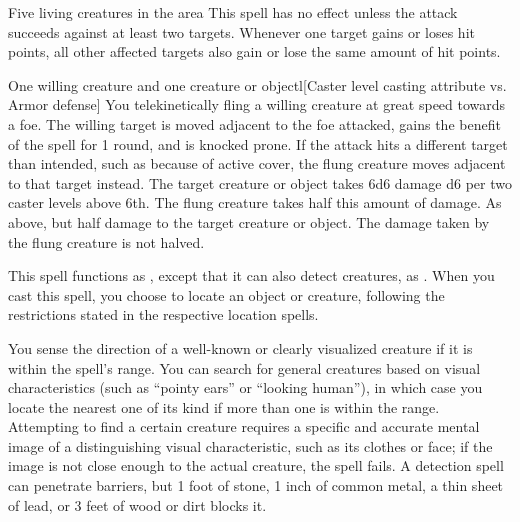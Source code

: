 \spelldur{\durshort}
\begin{spelltargets}{Five living creatures in the area}
    \spellspecial This spell has no effect unless the attack succeeds against at least two targets.
    \spellsuccess Whenever one target gains or loses hit points, all other affected targets also gain or lose the same amount of hit points.
\end{spelltargets}

\spellrng{\rngclose}
\begin{spelltargets}{One willing creature and one creature or object}l[Caster level \add casting attribute vs. Armor defense]
    \spelleffect You telekinetically fling a willing creature at great speed towards a foe. The willing target is moved adjacent to the foe attacked, gains the benefit of the  spell for 1 round, and is knocked prone. If the attack hits a different target than intended, such as because of active cover, the flung creature moves adjacent to that target instead.
    \spellsuccess The target creature or object takes 6d6 damage \add d6 per two caster levels above 6th. The flung creature takes half this amount of damage.
    \spellfailure As above, but half damage to the target creature or object. The damage taken by the flung creature is not halved.
\end{spelltargets}

\spellrng{\rngext}
\spelldur{\durlong \dismissable}
\spelleffect This spell functions as , except that it can also detect creatures, as . When you cast this spell, you choose to locate an object or creature, following the restrictions stated in the respective location spells.

\spellrng{\rnglong}
\spelldur{\durmed \dismissable}
\spelleffect You sense the direction of a well-known or clearly visualized creature if it is within the spell's range. You can search for general creatures based on visual characteristics (such as ``pointy ears'' or ``looking human''), in which case you locate the nearest one of its kind if more than one is within the range. Attempting to find a certain creature requires a specific and accurate mental image of a distinguishing visual characteristic, such as its clothes or face; if the image is not close enough to the actual creature, the spell fails.
\spellnotes A detection spell can penetrate barriers, but 1 foot of stone, 1 inch of common metal, a thin sheet of lead, or 3 feet of wood or dirt blocks it.


